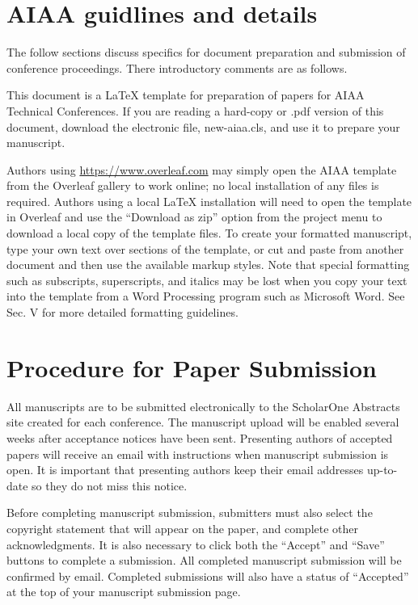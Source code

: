 \section{AIAA guidlines and details}
The follow sections discuss specifics for document preparation and submission of conference proceedings. There introductory comments are as follows.

This document is a \LaTeX{} template for preparation of papers for AIAA Technical Conferences. If you are reading a hard-copy or .pdf version of this document, download the electronic file, new-aiaa.cls, and use it to prepare your manuscript.

Authors using \url{https://www.overleaf.com} may simply open the AIAA template from the Overleaf gallery to work online; no local installation of any files is required. Authors using a local \LaTeX{} installation will need to open the template in Overleaf and use the ``Download as zip'' option from the project menu to download a local copy of the template files. To create your formatted manuscript, type your own text over sections of the template, or cut and paste from another document and then use the available markup styles. Note that special formatting such as subscripts, superscripts, and italics may be lost when you copy your text into the template from a Word Processing program such as Microsoft Word. See Sec. V for more detailed formatting guidelines.
 
\section{Procedure for Paper Submission}

All manuscripts are to be submitted electronically to the ScholarOne Abstracts site created for each conference. The manuscript upload will be enabled several weeks after acceptance notices have been sent. Presenting authors of accepted papers will receive an email with instructions when manuscript submission is open. It is important that presenting authors keep their email addresses up-to- date so they do not miss this notice.

Before completing manuscript submission, submitters must also select the copyright statement that will appear on the paper, and complete other acknowledgments. It is also necessary to click both the ``Accept'' and ``Save'' buttons to complete a submission. All completed manuscript submission will be confirmed by email. Completed submissions will also have a status of ``Accepted'' at the top of your manuscript submission page.

